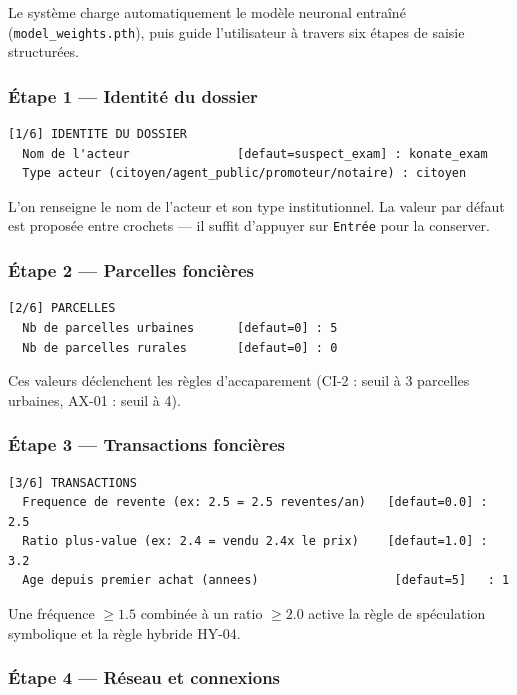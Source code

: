 \documentclass[11pt,a4paper]{report}
\begin{document}
Le système charge automatiquement le modèle neuronal entraîné
(\texttt{model\_weights.pth}), puis guide l'utilisateur à travers
six étapes de saisie structurées.

\subsubsection*{Étape 1 — Identité du dossier}

\begin{lstlisting}
[1/6] IDENTITE DU DOSSIER
  Nom de l'acteur               [defaut=suspect_exam] : konate_exam
  Type acteur (citoyen/agent_public/promoteur/notaire) : citoyen
\end{lstlisting}

L'on renseigne le nom de l'acteur et son type institutionnel.
La valeur par défaut est proposée entre crochets — il suffit d'appuyer
sur \texttt{Entrée} pour la conserver.

\subsubsection*{Étape 2 — Parcelles foncières}

\begin{lstlisting}
[2/6] PARCELLES
  Nb de parcelles urbaines      [defaut=0] : 5
  Nb de parcelles rurales       [defaut=0] : 0
\end{lstlisting}

Ces valeurs déclenchent les règles d'accaparement (CI-2 : seuil à 3
parcelles urbaines, AX-01 : seuil à 4).

\subsubsection*{Étape 3 — Transactions foncières}

\begin{lstlisting}
[3/6] TRANSACTIONS
  Frequence de revente (ex: 2.5 = 2.5 reventes/an)   [defaut=0.0] : 2.5
  Ratio plus-value (ex: 2.4 = vendu 2.4x le prix)    [defaut=1.0] : 3.2
  Age depuis premier achat (annees)                   [defaut=5]   : 1
\end{lstlisting}

Une fréquence $\geq 1.5$ combinée à un ratio $\geq 2.0$ active
la règle de spéculation symbolique et la règle hybride HY-04.

\subsubsection*{Étape 4 — Réseau et connexions}
\end{document}
